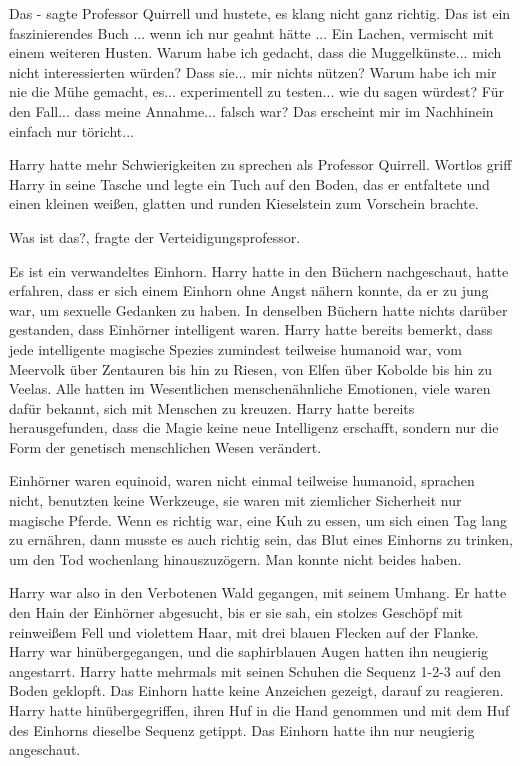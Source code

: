 \glqq{}Das -\grqq{} sagte Professor Quirrell und hustete, es klang nicht ganz richtig.
\glqq{}Das ist ein faszinierendes Buch ... wenn ich nur geahnt hätte ...\grqq{} Ein
Lachen, vermischt mit einem weiteren Husten. \glqq{}Warum habe ich gedacht, dass
die Muggelkünste... mich nicht interessierten würden? Dass sie... mir nichts
nützen? Warum habe ich mir nie die Mühe gemacht, es... experimentell zu
testen... wie du sagen würdest? Für den Fall... dass meine Annahme... falsch
war? Das erscheint mir im Nachhinein einfach nur töricht...\grqq{}

Harry hatte mehr Schwierigkeiten zu sprechen als Professor Quirrell. Wortlos
griff Harry in seine Tasche und legte ein Tuch auf den Boden, das er entfaltete
und einen kleinen weißen, glatten und runden Kieselstein zum Vorschein brachte.

\glqq{}Was ist das?\grqq{}, fragte der Verteidigungsprofessor.

\glqq{}Es ist ein verwandeltes Einhorn.\grqq{} Harry hatte in den Büchern nachgeschaut,
hatte erfahren, dass er sich einem Einhorn ohne Angst nähern konnte, da er zu
jung war, um sexuelle Gedanken zu haben. In denselben Büchern hatte nichts
darüber gestanden, dass Einhörner intelligent waren. Harry hatte bereits
bemerkt, dass jede intelligente magische Spezies zumindest teilweise humanoid
war, vom Meervolk über Zentauren bis hin zu Riesen, von Elfen über Kobolde bis
hin zu Veelas. Alle hatten im Wesentlichen menschenähnliche Emotionen, viele
waren dafür bekannt, sich mit Menschen zu kreuzen. Harry hatte bereits
herausgefunden, dass die Magie keine neue Intelligenz erschafft, sondern nur die
Form der genetisch menschlichen Wesen verändert.

Einhörner waren equinoid, waren nicht einmal teilweise humanoid, sprachen nicht,
benutzten keine Werkzeuge, sie waren mit ziemlicher Sicherheit nur magische
Pferde. Wenn es richtig war, eine Kuh zu essen, um sich einen Tag lang zu
ernähren, dann musste es auch richtig sein, das Blut eines Einhorns zu trinken,
um den Tod wochenlang hinauszuzögern. Man konnte nicht beides haben.

Harry war also in den Verbotenen Wald gegangen, mit seinem Umhang. Er hatte den
Hain der Einhörner abgesucht, bis er sie sah, ein stolzes Geschöpf mit
reinweißem Fell und violettem Haar, mit drei blauen Flecken auf der Flanke.
Harry war hinübergegangen, und die saphirblauen Augen hatten ihn neugierig
angestarrt. Harry hatte mehrmals mit seinen Schuhen die Sequenz 1-2-3 auf den
Boden geklopft. Das Einhorn hatte keine Anzeichen gezeigt, darauf zu reagieren.
Harry hatte hinübergegriffen, ihren Huf in die Hand genommen und mit dem Huf des
Einhorns dieselbe Sequenz getippt. Das Einhorn hatte ihn nur neugierig
angeschaut.

